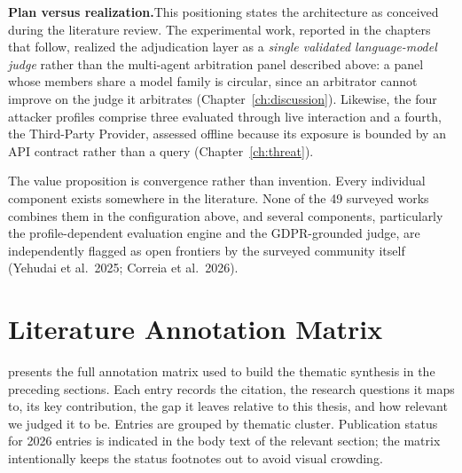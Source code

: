 \begin{notebox}
\textbf{Plan versus realization.}\quad This positioning states the architecture as conceived during the literature review. The experimental work, reported in the chapters that follow, realized the adjudication layer as a \emph{single validated language-model judge} rather than the multi-agent arbitration panel described above: a panel whose members share a model family is circular, since an arbitrator cannot improve on the judge it arbitrates (Chapter~\ref{ch:discussion}). Likewise, the four attacker profiles comprise three evaluated through live interaction and a fourth, the Third-Party Provider, assessed offline because its exposure is bounded by an API contract rather than a query (Chapter~\ref{ch:threat}).
\end{notebox}

\enlargethispage{2\baselineskip}%
The value proposition is convergence rather than invention. Every individual component exists somewhere in the literature. None of the 49 surveyed works combines them in the configuration above, and several components, particularly the profile-dependent evaluation engine and the GDPR-grounded judge, are independently flagged as open frontiers by the surveyed community itself (Yehudai et al.\ 2025; Correia et al.\ 2026).



\newpage
\section{Literature Annotation Matrix}
\label{app:annotation}

 presents the full annotation matrix used to build the thematic synthesis in the preceding sections. Each entry records the citation, the research questions it maps to, its key contribution, the gap it leaves relative to this thesis, and how relevant we judged it to be. Entries are grouped by thematic cluster. Publication status for 2026 entries is indicated in the body text of the relevant section; the matrix intentionally keeps the status footnotes out to avoid visual crowding.


